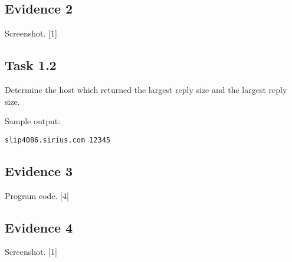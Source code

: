 \subsection*{Evidence 2 }

Screenshot. \hfill{}{[}1{]}

\subsection*{Task 1.2}

Determine the host which returned the largest reply size and the largest
reply size.

Sample output: 

\texttt{slip4086.sirius.com 12345}

\subsection*{Evidence 3 }

Program code.\hfill{} {[}4{]}

\subsection*{Evidence 4 }

Screenshot. \hfill{}{[}1{]}